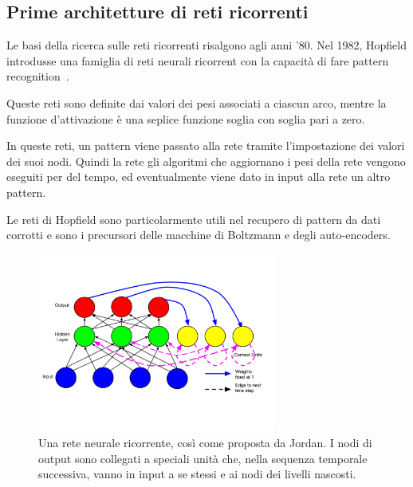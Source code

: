 \subsection{Prime architetture di reti ricorrenti}

Le basi della ricerca sulle reti ricorrenti risalgono agli anni '80. Nel 1982,
Hopfield introdusse una famiglia di reti neurali ricorrent con la capacit\`a di
fare pattern recognition~\cite{Hopfield:1982}.

Queste reti sono definite dai valori dei pesi associati a ciascun arco, mentre la
funzione d'attivazione \`e una seplice funzione soglia con soglia pari a zero.

In queste reti, un pattern viene passato alla rete tramite l'impostazione dei
valori dei suoi nodi. Quindi la rete gli algoritmi che aggiornano i pesi della
rete vengono eseguiti per del tempo, ed eventualmente viene dato in input alla
rete un altro pattern.

Le reti di Hopfield sono particolarmente utili nel recupero di pattern da dati
corrotti e sono i precursori delle macchine di Boltzmann e degli auto-encoders.

\begin{figure}[tp]
  \centering
  \begin{center}
    \includegraphics[width=0.7\textwidth]{./images/jordanNetwork.png}
  \end{center}
  \caption{Una rete neurale ricorrente, cos\`i come proposta da Jordan.
  I nodi di output sono collegati a speciali unit\`a che, nella sequenza temporale
  successiva, vanno in input a se stessi e ai nodi dei livelli nascosti.}
  \label{fig:jordanNetwork}
\end{figure}

